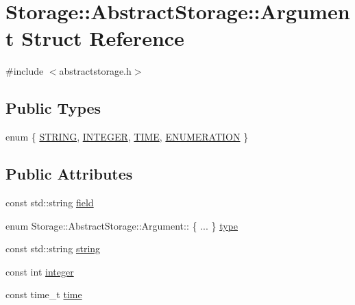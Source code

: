 \hypertarget{structStorage_1_1AbstractStorage_1_1Argument}{
\section{Storage::AbstractStorage::Argument Struct Reference}
\label{d9/dc9/structStorage_1_1AbstractStorage_1_1Argument}
}


{\ttfamily \#include $<$abstractstorage.h$>$}

\subsection*{Public Types}
\begin{DoxyCompactItemize}
\item 
enum \{ \hyperlink{structStorage_1_1AbstractStorage_1_1Argument_a92adab5cf7e02947e2e75fba5e11446ca3268a68276a4ac73701de323858c945b}{STRING}, 
\hyperlink{structStorage_1_1AbstractStorage_1_1Argument_a92adab5cf7e02947e2e75fba5e11446ca4f57d3a5ac601598730fb58b08c81540}{INTEGER}, 
\hyperlink{structStorage_1_1AbstractStorage_1_1Argument_a92adab5cf7e02947e2e75fba5e11446ca6f9cbb024f036014248e8322253da11e}{TIME}, 
\hyperlink{structStorage_1_1AbstractStorage_1_1Argument_a92adab5cf7e02947e2e75fba5e11446ca37240303f27a558e24e9e07d1abfa215}{ENUMERATION}
 \}
\end{DoxyCompactItemize}
\subsection*{Public Attributes}
\begin{DoxyCompactItemize}
\item 
const std::string \hyperlink{structStorage_1_1AbstractStorage_1_1Argument_ad48a91372dd1a9445b4ddcee0bc8336a}{field}
\item 
enum Storage::AbstractStorage::Argument:: \{ ... \}  \hyperlink{structStorage_1_1AbstractStorage_1_1Argument_a77f04e835f26305c4222df78c07f8efd}{type}
\item 
const std::string \hyperlink{structStorage_1_1AbstractStorage_1_1Argument_ab8ea8281cdefeb901a267261ed2e0478}{string}
\item 
const int \hyperlink{structStorage_1_1AbstractStorage_1_1Argument_a6b20329db4720c44c45d8380f840dbec}{integer}
\item 
const time\_\-t \hyperlink{structStorage_1_1AbstractStorage_1_1Argument_ae6cc69656647a6cccf725a0156373a51}{time}
\end{DoxyCompactItemize}


